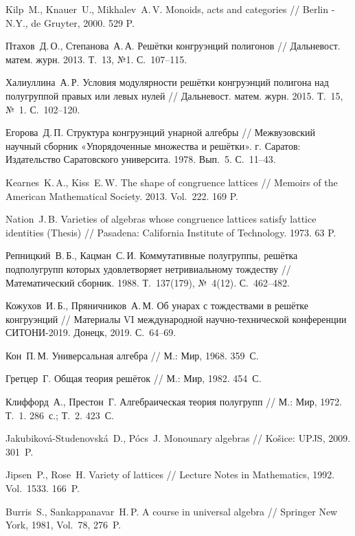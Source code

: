 \documentclass[11pt,twoside,draft
]{article}
\begin{document}
\begin{thebibliography}{99}
	
	Kilp~M., Knauer~U., Mikhalev~A.\,V. Monoids, acts and categories // Berlin - N.Y., de Gruyter, 2000. 529 P.
	
	Птахов~Д.\,О., Степанова~А.\,А. Решётки конгруэнций полигонов // Дальневост. матем. журн. 2013. Т.~13, №1. С.~107--115.
	
	Халиуллина~А.\,Р. Условия модулярности решётки конгруэнций полигона над полугруппой правых или левых нулей // Дальневост. матем. журн. 2015. Т.~15, №~1. С.~102--120.
	
	Егорова~Д.\,П. Структура конгруэнций унарной алгебры // Межвузовский научный сборник «Упорядоченные множества и решётки». г. Саратов: Издательство Саратовского университа. 1978. Вып.~5. С.~11--43.
	
	Kearnes~K.\,A., Kiss~E.\,W. The shape of congruence lattices // Memoirs of the American Mathematical Society. 2013. Vol.~222. 169 P.
	
	Nation~J.\,B. Varieties of algebras whose congruence lattices satisfy lattice identities (Thesis) // Pasadena: California Institute of Technology. 1973. 63 P.
	
	Репницкий~В.\,Б., Кацман~С.\,И. Коммутативные полугруппы, решётка подполугрупп которых удовлетворяет нетривиальному тождеству // Математический сборник. 1988. Т.~137(179), №~4(12). С.~462--482.
	
	Кожухов~И.\,Б., Пряничников~А.\,М. Об унарах с тождествами в решётке конгруэнций // Материалы VI международной научно-технической конференции СИТОНИ-2019. Донецк, 2019. С.~64--69.
	
	Кон~П.\,М. Универсальная алгебра // М.: Мир, 1968. 359~С.
	
	Гретцер~Г. Общая теория решёток // М.: Мир, 1982. 454~С.
	
	Клиффорд~А., Престон~Г. Алгебраическая теория полугрупп // М.: Мир, 1972. Т.~1. 286~с.; Т.~2. 423~С.
	
	Jakubiková-Studenovská~D., Pócs~J. Monounary algebras // Košice: UPJS, 2009. 301~P.
	
	Jipsen~P., Rose~H. Variety of lattices // Lecture Notes in Mathematics, 1992. Vol.~1533. 166~P.
	
	Burris~S., Sankappanavar~H.\,P. A course in universal algebra // Springer New York, 1981, Vol.~78, 276~P.
	
\end{thebibliography}
\end{document}
